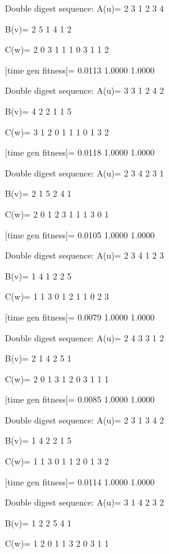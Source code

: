Double digest sequence:
A(u)=
     2     3     1     2     3     4

B(v)=
     2     5     1     4     1     2

C(w)=
     2     0     3     1     1     1     0     3     1     1     2

[time gen fitness]=
    0.0113    1.0000    1.0000

Double digest sequence:
A(u)=
     3     3     1     2     4     2

B(v)=
     4     2     2     1     1     5

C(w)=
     3     1     2     0     1     1     1     0     1     3     2

[time gen fitness]=
    0.0118    1.0000    1.0000

Double digest sequence:
A(u)=
     2     3     4     2     3     1

B(v)=
     2     1     5     2     4     1

C(w)=
     2     0     1     2     3     1     1     1     3     0     1

[time gen fitness]=
    0.0105    1.0000    1.0000

Double digest sequence:
A(u)=
     2     3     4     1     2     3

B(v)=
     1     4     1     2     2     5

C(w)=
     1     1     3     0     1     2     1     1     0     2     3

[time gen fitness]=
    0.0079    1.0000    1.0000

Double digest sequence:
A(u)=
     2     4     3     3     1     2

B(v)=
     2     1     4     2     5     1

C(w)=
     2     0     1     3     1     2     0     3     1     1     1

[time gen fitness]=
    0.0085    1.0000    1.0000

Double digest sequence:
A(u)=
     2     3     1     3     4     2

B(v)=
     1     4     2     2     1     5

C(w)=
     1     1     3     0     1     1     2     0     1     3     2

[time gen fitness]=
    0.0114    1.0000    1.0000

Double digest sequence:
A(u)=
     3     1     4     2     3     2

B(v)=
     1     2     2     5     4     1

C(w)=
     1     2     0     1     1     3     2     0     3     1     1

